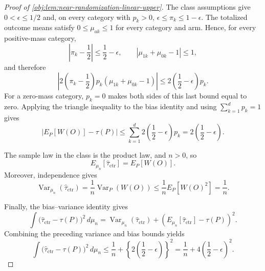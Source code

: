 \begin{proof}[Proof of \cref{obj:lem:near-randomization-linear-upper}]
The class assumptions give \(0<\epsilon\le1/2\) and, on every category with \(p_k>0\),
\(\epsilon\le\pi_k\le1-\epsilon\). The totalized outcome means satisfy \(0\le\mu_{ak}\le1\) for every category and arm. Hence, for every positive-mass category,
\[
\left|\pi_k-\frac12\right|\le\frac12-\epsilon,
\qquad
|\mu_{1k}+\mu_{0k}-1|\le1,
\]
and therefore
\[
\left|2\left(\pi_k-\frac12\right)p_k(\mu_{1k}+\mu_{0k}-1)\right|
\le
2\left(\frac12-\epsilon\right)p_k .
\]
For a zero-mass category, \(p_k=0\) makes both sides of this last bound equal to zero. Applying the triangle inequality to the bias identity and using \(\sum_{k=1}^d p_k=1\) gives
\[
\left|E_P[W(O)]-\tau(P)\right|
\le
\sum_{k=1}^d 2\left(\frac12-\epsilon\right)p_k
=
2\left(\frac12-\epsilon\right).
\]

The sample law in the class is the product law, and \(n>0\), so
\[
E_{\mu_n}[\widehat\tau_{\mathrm{ctr}}]=E_P[W(O)].
\]
Moreover, independence gives
\[
\operatorname{Var}_{\mu_n}(\widehat\tau_{\mathrm{ctr}})
=
\frac1n\operatorname{Var}_P(W(O))
\le
\frac1n E_P[W(O)^2]
=
\frac1n .
\]

Finally, the bias--variance identity gives
\[
\int
\bigl(\widehat\tau_{\mathrm{ctr}}-\tau(P)\bigr)^2\,d\mu_n
=
\operatorname{Var}_{\mu_n}(\widehat\tau_{\mathrm{ctr}})
+
\left(E_{\mu_n}[\widehat\tau_{\mathrm{ctr}}]-\tau(P)\right)^2 .
\]
Combining the preceding variance and bias bounds yields
\[
\int
\bigl(\widehat\tau_{\mathrm{ctr}}-\tau(P)\bigr)^2\,d\mu_n
\le
\frac1n+
\left\{2\left(\frac12-\epsilon\right)\right\}^2
=
\frac1n+4\left(\frac12-\epsilon\right)^2 .
\]
\end{proof}
